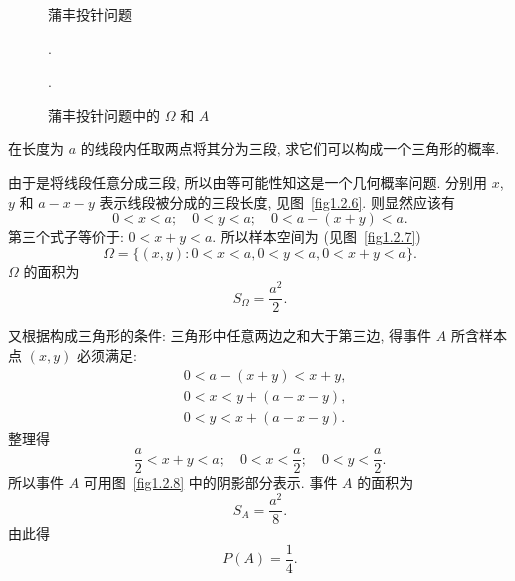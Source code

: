 \begin{figure}
  \centering
  \begin{minipage}[b]{0.5\linewidth}
  \centering
   \caption{蒲丰投针问题}.
    \label{fig1.2.4}
  \end{minipage}%
  \begin{minipage}[b]{0.5\linewidth}
  \centering
  \caption{蒲丰投针问题中的 $\Omega$ 和 $A$}.
    \label{fig1.2.5}
  \end{minipage}
\end{figure}

\begin{example}
  在长度为 $a$ 的线段内任取两点将其分为三段,
  求它们可以构成一个三角形的概率.
\end{example}

\begin{solution}
  由于是将线段任意分成三段,
  所以由等可能性知这是一个几何概率问题.
  分别用 $x$, $y$ 和 $a - x - y$ 表示线段被分成的三段长度,
  见图~\ref{fig1.2.6}.
  则显然应该有
  \[
    0 < x < a; \quad 0 < y < a; \quad 0 < a - (x + y) < a.
  \]
  第三个式子等价于:
  $0 < x + y < a$.
  所以样本空间为 (见图~\ref{fig1.2.7})
  \[
    \Omega = \{(x, y): 0 < x < a, 0 < y < a, 0 < x + y < a\}.
  \]
  $\Omega$ 的面积为
  \[
    S _\Omega = \frac{a^2}{2}.
  \]

  又根据构成三角形的条件:
  三角形中任意两边之和大于第三边,
  得事件 $A$ 所含样本点 $(x,y)$ 必须满足:
  \begin{align*}
    & 0 < a - (x + y) < x + y,\\
    & 0 < x < y + (a - x - y),\\
    & 0 < y < x + (a - x - y).
  \end{align*}
  整理得
  \[
    \frac{a}{2} < x + y < a;\quad 0 < x < \frac{a}{2}; \quad 0 < y < \frac{a}{2}.
  \]
  所以事件 $A$ 可用图~\ref{fig1.2.8} 中的阴影部分表示.
  事件 $A$ 的面积为
  \[ S _A = \frac{a^2}{8}. \]
  由此得
  \[P (A) = \frac{1}{4}. \]
\end{solution}

